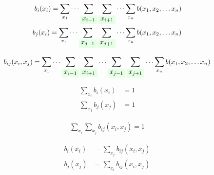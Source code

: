 \documentclass[fleqn,leqno]{article}
\newcommand{\highlight}[1]{\colorbox{green!10}{$\displaystyle#1$}}
\begin{document}
\begin{equation} \label{eq:marginal_probabilities_one_node_b}
\begin{split}
b_i(x_i) = \sum_{x_1} \cdots \sum_{ \highlight{ x_{i - 1} } } \sum_{ \highlight{ x_{i + 1} } } \cdots \sum_{x_n} b(x_1, x_2, \dots x_n) \\
b_j(x_i) = \sum_{x_1} \cdots \sum_{ \highlight{ x_{j - 1} } } \sum_{ \highlight{ x_{j + 1} } } \cdots \sum_{x_n} b(x_1, x_2, \dots x_n) \\
\end{split}
\end{equation}

\begin{equation} \label{eq:marginal_probabilities_two_nodes_b}
\begin{split}
b_{ij}(x_i, x_j) = \sum_{x_1} \cdots \sum_{ \highlight{ x_{i - 1} } } \sum_{ \highlight{ x_{i + 1} } } \cdots \sum_{ \highlight{ x_{j - 1} } } \sum_{ \highlight{ x_{j + 1} } } \cdots \sum_{x_n} b(x_1, x_2, \dots x_n)
\end{split}
\end{equation}

\begin{equation} \label{eq:sum_over_states_of_one_node_marginal_probabilities_b}
\begin{split}
\sum_{x_i} b_i(x_i) & = 1 \\
\sum_{x_j} b_j(x_j) & = 1
\end{split}
\end{equation}

\begin{equation} \label{eq:sum_over_states_of_two_node_marginal_probabilities_b}
\begin{split}
\sum_{x_i} \sum_{x_j} b_{ij}(x_i, x_j) = 1
\end{split}
\end{equation}

\begin{equation} \label{eq:one_node_marginal_probabilities_from_two_node_marginal_probabilities_b}
\begin{split}
b_i(x_i) & = \sum_{x_j} b_{ij}(x_i, x_j) \\
b_j(x_j) & = \sum_{x_i} b_{ij}(x_i, x_j) \\
\end{split}
\end{equation}
\end{document}
